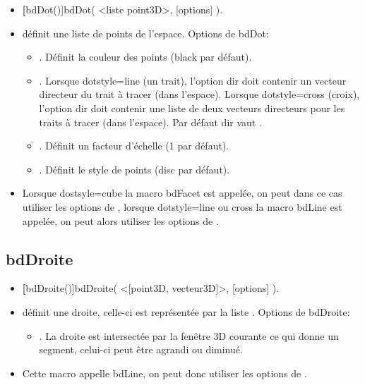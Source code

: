 \begin{itemize}
 \item \util \textbf[bdDot()]{bdDot( <liste point3D>, [options] )}.
 \item \desc définit une liste de points de l'espace. Options de bdDot: 

  \begin{itemize}
  \item {}. Définit la couleur des points (black par défaut).
  \item {}. Lorsque dotstyle=line (un trait), l'option dir doit contenir un vecteur directeur du trait à tracer (dans l'espace). Lorsque dotstyle=cross (croix), l'option dir doit contenir une liste de deux vecteurs directeurs pour les traits à tracer (dans l'espace). Par défaut dir vaut \Nil.
  \item {}. Définit un facteur d'échelle (1 par défaut).
  \item {}. Définit le style de points (disc par défaut).
  \end{itemize}
 \item Lorsque dostsyle=cube la macro bdFacet est appelée, on peut dans ce cas utiliser les options de , lorsque dotstyle=line ou cross la macro bdLine est appelée, on peut alors utiliser les options de .
\end{itemize}


\subsection{bdDroite}

\begin{itemize}
 \item \util \textbf[bdDroite()]{bdDroite( <[point3D, vecteur3D]>, [options] )}.
 \item \desc définit une droite, celle-ci est représentée par la liste . Options de bdDroite: 

  \begin{itemize}
  \item {}. La droite est intersectée par la fenêtre 3D courante ce qui donne un segment, celui-ci peut être agrandi ou diminué.
  \end{itemize}
 \item Cette macro appelle bdLine, on peut donc utiliser les options de .
\end{itemize}



